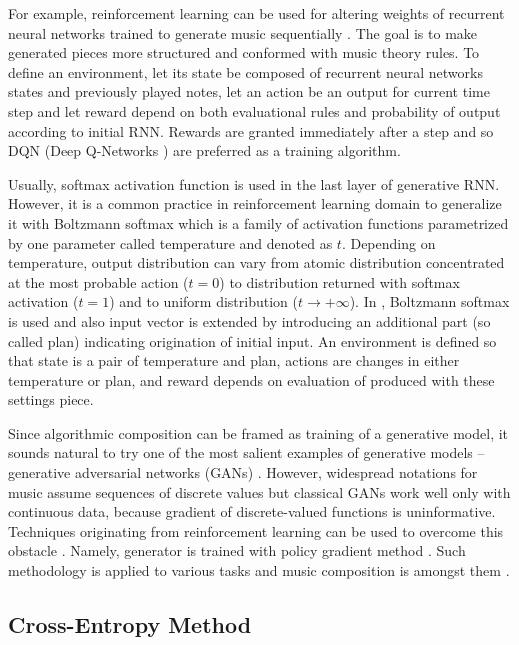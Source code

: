 \documentclass{article}
\begin{document}
For example, reinforcement learning can be used for altering weights of recurrent neural networks trained to generate music sequentially \cite{jaques2016generating, kotecha2018bach}. The goal is to make generated pieces more structured and conformed with music theory rules. To define an environment, let its state be composed of recurrent neural networks states and previously played notes, let an action be an output for current time step and let reward depend on both evaluational rules and probability of output according to initial RNN. Rewards are granted immediately after a step and so DQN (Deep Q-Networks \cite{mnih2013playing}) are preferred as a training algorithm.

Usually, softmax activation function is used in the last layer of generative RNN. However, it is a common practice in reinforcement learning domain to generalize it with Boltzmann softmax which is a family of activation functions parametrized by one parameter called temperature and denoted as $t$. Depending on temperature, output distribution can vary from atomic distribution concentrated at the most probable action ($t = 0$) to distribution returned with softmax activation ($t = 1$) and to uniform distribution ($t \to +\infty$). In \cite{kumar2019polyphonic}, Boltzmann softmax is used and also input vector is extended by introducing an additional part (so called plan) indicating origination of initial input. An environment is defined so that state is a pair of temperature and plan, actions are changes in either temperature or plan, and reward depends on evaluation of produced with these settings piece.

Since algorithmic composition can be framed as training of a generative model, it sounds natural to try one of the most salient examples of generative models -- generative adversarial networks (GANs) \cite{goodfellow2014gan}. However, widespread notations for music assume sequences of discrete values but classical GANs work well only with continuous data, because gradient of discrete-valued functions is uninformative. Techniques originating from reinforcement learning can be used to overcome this obstacle \cite{yu2016seqgan,hjelm2017boundary}. Namely, generator is trained with policy gradient method \cite{williams1992simple}. Such methodology is applied to various tasks and music composition is amongst them \cite{limaguimaraes2017objective}.

\subsection{Cross-Entropy Method}
\label{subsec:crossentropy}
\end{document}
